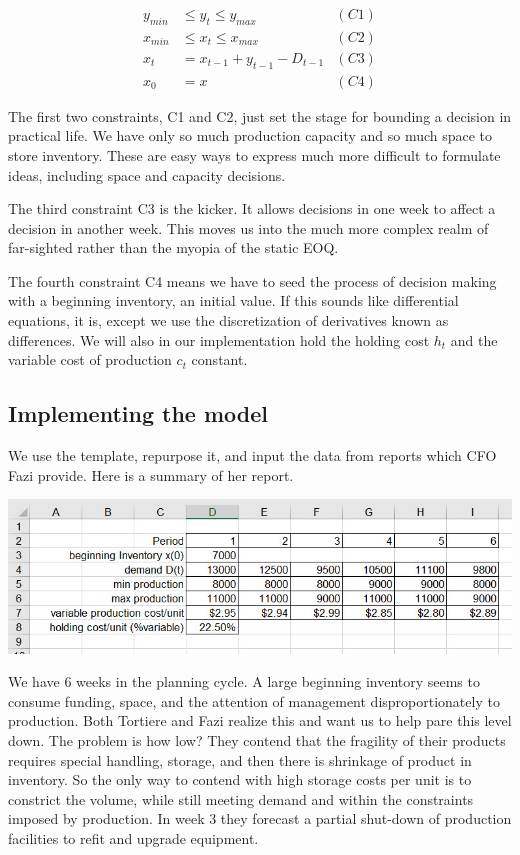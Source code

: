 \documentclass[
]{book}
\begin{document}
\[
\begin{align}
y_{min} &\leq y_t \leq y_{max} & (C1)\\
x_{min} &\leq x_t \leq x_{max} & (C2)\\
x_t &= x_{t-1} + y_{t-1} - D_{t-1} & (C3)\\
x_0 &= x & (C4)
\end{align}
\]

The first two constraints, C1 and C2, just set the stage for bounding a decision in practical life. We have only so much production capacity and so much space to store inventory. These are easy ways to express much more difficult to formulate ideas, including space and capacity decisions.

The third constraint C3 is the kicker. It allows decisions in one week to affect a decision in another week. This moves us into the much more complex realm of far-sighted rather than the myopia of the static EOQ.

The fourth constraint C4 means we have to seed the process of decision making with a beginning inventory, an initial value. If this sounds like differential equations, it is, except we use the discretization of derivatives known as differences. We will also in our implementation hold the holding cost \(h_t\) and the variable cost of production
\(c_t\) constant.

\hypertarget{implementing-the-model}{%
\subsection{Implementing the model}\label{implementing-the-model}}

We use the template, repurpose it, and input the data from reports which CFO Fazi provide. Here is a summary of her report.

\includegraphics{images/04/multi-prod-data.jpg}

We have 6 weeks in the planning cycle. A large beginning inventory seems to consume funding, space, and the attention of management disproportionately to production. Both Tortiere and Fazi realize this and want us to help pare this level down. The problem is how low? They contend that the fragility of their products requires special handling, storage, and then there is shrinkage of product in inventory. So the only way to contend with high storage costs per unit is to constrict the volume, while still meeting demand and within the constraints imposed by production. In week 3 they forecast a partial shut-down of production facilities to refit and upgrade equipment.
\end{document}
